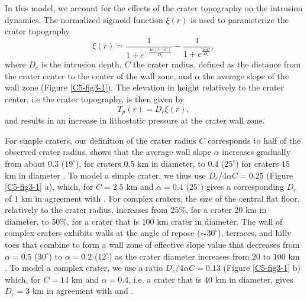 In this model, we account for  the effects of the crater topography on
the intrusion  dynamics.  The normalized sigmoid  function $\xi(r)$ is
used to parameterize the crater topography
\begin{equation}
  \xi(r)=\frac{1}{1+e^{-\frac{4\alpha(r-C)}{D_c}}}-\frac{1}{1+e^{\frac{4\alpha C}{D_c}}},
  \label{C5-3-3}
\end{equation}	
where $D_c$ is the intrusion depth,  $C$ the crater radius, defined as
the distance  from the crater center  to the center of  the wall zone,
and   $\alpha$  the   average   slope  of   the   wall  zone   (Figure
\ref{C5-fig3-1}).  The  elevation in  height relatively to  the crater
center, i.e the crater topography, is then given by
\begin{equation}
  T_p(r)=D_c\xi(r),
  \label{C5-topo}
\end{equation}
and results in an increase in  lithostatic pressure at the crater wall
zone.
	
For  simple  craters,   our  definition  of  the   crater  radius  $C$
corresponds    to    half    of   the    observed    crater    radius.
\citet{Pike:1980eh}  shows  that  the   average  wall  slope  $\alpha$
increases gradually from about $0.3$ ($19^{\circ}$), for craters $0.5$
km  in  diameter, to  $0.4$  ($25^{\circ}$)  for  craters $15$  km  in
diameter \citep{Kalynn:2013fg}.  To model a simple crater, we thus use
$D_c/4\alpha C  =0.25$ (Figure \ref{C5-fig3-1} a),  which, for $C=2.5$
km and $\alpha=0.4$ ($25^{\circ}$) gives  a corresponding $D_c$ of $1$
km in  agreement with  \citet{Pike:1980eh}.  For complex  craters, the
size  of the  central flat  floor,  relatively to  the crater  radius,
increases from $25  \%$, for a crater  20 km in diameter,  to $50 \%$,
for a crater that is $100$ km crater in diameter.  The wall of complex
craters exhibits  walls at  the angle  of repose  ($\sim 30^{\circ}$),
terraces, and hilly toes that combine to form a wall zone of effective
slope  value  that  decreases  from $\alpha=  0.5$  ($30^{\circ}$)  to
$\alpha=0.2$ ($12^{\circ}$) as the crater diameter increases from $20$
to $100$ km \citep{Pike:1980eh,Bray:2008fu,Kalynn:2013fg}.  To model a
complex  crater,   we  use   a  ratio  $D_c/4\alpha   C=0.13$  (Figure
\ref{C5-fig3-1}  b) which,  for $C=14$  km and  $\alpha=0.4$, i.e.   a
crater that is $40$ km in diameter, gives $D_c=3$ km in agreement with
\citet{Pike:1980eh} and \citet{Kalynn:2013fg}.
	 
